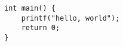 \documentclass{article}
\begin{document}
\begin{verbatim}
int main() {
    printf("hello, world");
    return 0;
}
\end{verbatim}
\end{document}
